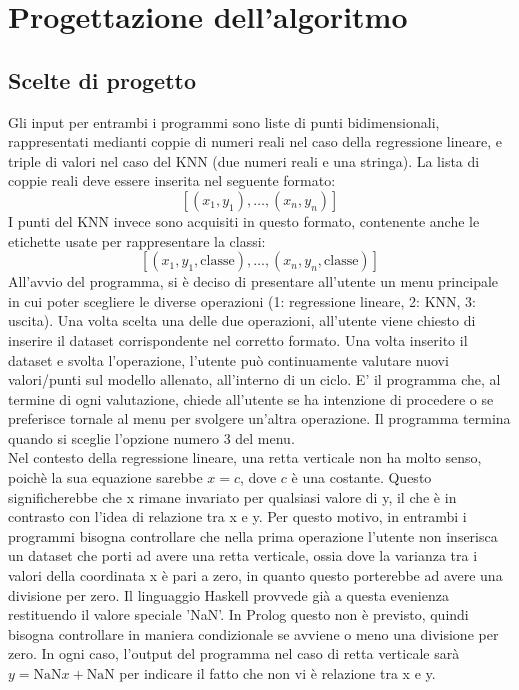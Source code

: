 \documentclass[11pt]{article}
\theoremstyle{definition}
\begin{document}
\newpage

\section{Progettazione dell'algoritmo}

\subsection{Scelte di progetto}
Gli input per entrambi i programmi sono liste di punti bidimensionali, rappresentati medianti coppie di numeri reali nel caso della regressione lineare, e triple di valori nel caso del KNN (due numeri reali e una stringa). La lista di coppie reali deve essere inserita nel seguente formato:
$$
[(x_1, y_1), \dots, (x_n, y_n)]
$$
I punti del KNN invece sono acquisiti in questo formato, contenente anche le etichette usate per rappresentare la classi:
$$
[(x_1, y_1, \text{classe}), \dots, (x_n, y_n, \text{classe})]
$$
All'avvio del programma, si è deciso di presentare all'utente un menu principale in cui poter scegliere le diverse operazioni (1: regressione lineare, 2: KNN, 3: uscita). Una volta scelta una delle due operazioni, all'utente viene chiesto di inserire il dataset corrispondente nel corretto formato. Una volta inserito il dataset e svolta l'operazione, l'utente può continuamente valutare nuovi valori/punti sul modello allenato, all'interno di un ciclo. E' il programma che, al termine di ogni valutazione, chiede all'utente se ha intenzione di procedere o se preferisce tornale al menu per svolgere un'altra operazione. Il programma termina quando si sceglie l'opzione numero 3 del menu.\\
\newline
Nel contesto della regressione lineare, una retta verticale non ha molto senso, poichè la sua equazione sarebbe $x=c$, dove $c$ è una costante. Questo significherebbe che x rimane invariato per qualsiasi valore di y, il che è in contrasto con l'idea di relazione tra x e y. Per questo motivo, in entrambi i programmi bisogna controllare che nella prima operazione l'utente non inserisca un dataset che porti ad avere una retta verticale, ossia dove la varianza tra i valori della coordinata x è pari a zero, in quanto questo porterebbe ad avere una divisione per zero. Il linguaggio Haskell provvede già a questa evenienza restituendo il valore speciale 'NaN'. In Prolog questo non è previsto, quindi bisogna controllare in maniera condizionale se avviene o meno una divisione per zero. In ogni caso, l'output del programma nel caso di retta verticale sarà $y=\text{NaN}x+\text{NaN}$ per indicare il fatto che non vi è relazione tra x e y.
\end{document}
